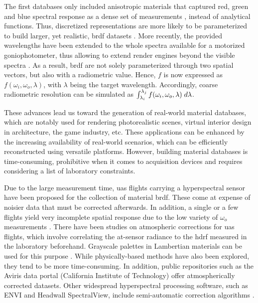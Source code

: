 The first databases only included anisotropic materials that captured red, green and blue spectral response as a dense set of measurements \cite{matusik_data-driven_2003}, instead of analytical functions. Thus, discretized representations are more likely to be parameterized to build larger, yet realistic, \acrshort{brdf} datasets \cite{serrano_intuitive_2016}. More recently, the provided wavelengths have been extended to the whole spectra available for a motorized goniophotometer, thus allowing to extend render engines beyond the visible spectra \cite{dupuy_adaptive_2018}. As a result, \acrshort{brdf} are not solely parameterized through two spatial vectors, but also with a radiometric value. Hence, $f$ is now expressed as $f(\omega_i, \omega_o, \lambda)$, with $\lambda$ being the target wavelength. Accordingly, coarse radiometric resolution can be simulated as $\int_{\lambda_i}^{\lambda_j} f(\omega_i, \omega_o, \lambda) \hspace{1mm} d\lambda$. 

These advances lead us toward the generation of real-world material databases, which are notably used for rendering photorealistic scenes, virtual interior design in architecture, the game industry, etc. These applications can be enhanced by the increasing availability of real-world scenarios, which can be efficiently reconstructed using versatile platforms. However, building material databases is time-consuming, prohibitive when it comes to acquisition devices and requires considering a list of laboratory constraints. 

Due to the large measurement time, \acrshort{uas} flights carrying a hyperspectral sensor have been proposed for the collection of material \acrshort{brdf}. These come at expense of noisier data that must be corrected afterwards. In addition, a single or a few flights yield very incomplete spatial response due to the low variety of $\omega_o$ measurements \cite{jurado_efficient_2022}. There have been studies on atmospheric corrections for \acrshort{uas} flights, which involve correlating the at-sensor radiance to the \acrshort{hdrf} measured in the laboratory beforehand. Grayscale palettes in Lambertian materials can be used for this purpose  \cite{lucieer_hyperuasimaging_2014}. While physically-based methods have also been explored, they tend to be more time-consuming. In addition, public repositories such as the Aviris data portal (California Institute of Technology) \cite{california_institute_of_technology_aviris_nodate} offer atmospherically corrected datasets. Other widespread hyperspectral processing software, such as ENVI and Headwall SpectralView, include semi-automatic correction algorithms \cite{queally_flexbrdf_2022, jia_kernel-driven_2020, sagan_data-driven_2022}.

